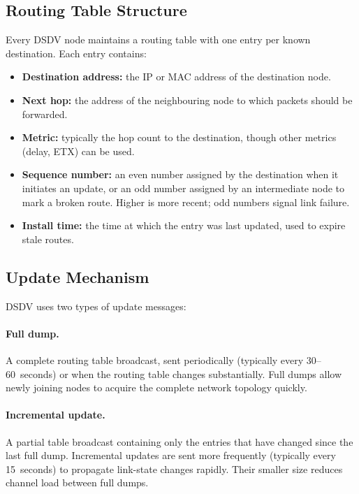 \subsection{Routing Table Structure}

Every DSDV node maintains a routing table with one entry per known destination. Each
entry contains:

\begin{itemize}
  \item \textbf{Destination address:} the IP or MAC address of the destination node.
  \item \textbf{Next hop:} the address of the neighbouring node to which packets should be forwarded.
  \item \textbf{Metric:} typically the hop count to the destination, though other metrics (delay, ETX) can be used.
  \item \textbf{Sequence number:} an even number assigned by the destination when it
    initiates an update, or an odd number assigned by an intermediate node to mark a
    broken route. Higher is more recent; odd numbers signal link failure.
  \item \textbf{Install time:} the time at which the entry was last updated, used to expire stale routes.
\end{itemize}

\subsection{Update Mechanism}

DSDV uses two types of update messages:

\paragraph{Full dump.}
A complete routing table broadcast, sent periodically (typically every 30--60~seconds)
or when the routing table changes substantially. Full dumps allow newly joining nodes to
acquire the complete network topology quickly.

\paragraph{Incremental update.}
A partial table broadcast containing only the entries that have changed since the last
full dump. Incremental updates are sent more frequently (typically every 15~seconds) to
propagate link-state changes rapidly. Their smaller size reduces channel load between
full dumps.

